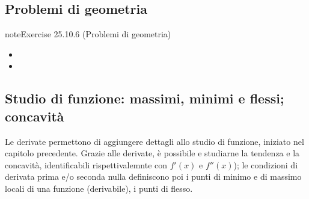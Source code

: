 \documentclass[letterpaper,10pt,italian]{jupyterBook}
\begin{document}
\subsection{Problemi di geometria}
\label{\detokenize{ch/infinitesimal_calculus/derivatives-problems:problemi-di-geometria}}\label{\detokenize{ch/infinitesimal_calculus/derivatives-problems:infinitesimal-calculus-derivatives-problems-geom}} \label{exercise:ch/infinitesimal_calculus/derivatives-problems-exercise-5}

\begin{sphinxadmonition}{note}{Exercise 25.10.6 (Problemi di geometria)}



\sphinxAtStartPar
{}
\begin{itemize}
\item {} 
\sphinxAtStartPar
{}

\item {} 
\sphinxAtStartPar
{}

\end{itemize}
\end{sphinxadmonition}


\subsection{Studio di funzione: massimi, minimi e flessi; concavità}
\label{\detokenize{ch/infinitesimal_calculus/derivatives-problems:studio-di-funzione-massimi-minimi-e-flessi-concavita}}\label{\detokenize{ch/infinitesimal_calculus/derivatives-problems:infinitesimal-calculus-derivatives-problems-fun}}
\sphinxAtStartPar
Le derivate permettono di aggiungere dettagli allo studio di funzione, iniziato nel capitolo precedente. Grazie alle derivate, è possibile e studiarne la tendenza e la concavità, identificabili rispettivalemnte con \(f'(x)\) e \(f''(x)\)); le condizioni di derivata prima e/o seconda nulla definiscono poi i punti di minimo e di massimo locali di una funzione (derivabile), i punti di flesso.
 \label{exercise:ch/infinitesimal_calculus/derivatives-problems-exercise-6}
\end{document}
